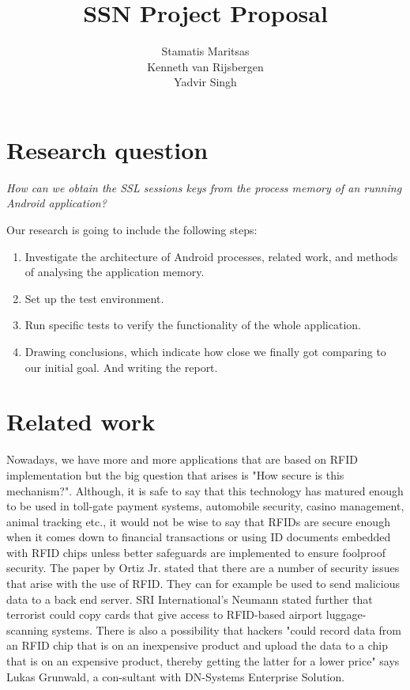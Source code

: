 \documentclass[11pt]{article}
\title{\textbf{SSN Project Proposal}}
\author{Stamatis Maritsas\\
		Kenneth van Rijsbergen\\
		Yadvir Singh}
\date{}
\begin{document}
\maketitle




\section{Research question}

\begin{framed}
\noindent \textit{How can we obtain the SSL sessions keys from the process memory of an running Android application?}
\end{framed}
Our research is going to include the following steps:

\begin{enumerate}
\item{Investigate the architecture of Android processes, related work, and methods of analysing the application memory.}
\item{Set up the test environment.}
\item{Run specific tests to verify the functionality of the whole application.}
\item{Drawing conclusions, which indicate how close we finally got comparing to our initial goal. And writing the report.}
\end{enumerate}

\clearpage

\section{Related work}
Nowadays, we have more and more applications that are based on RFID implementation but the big question that arises is "How secure is this mechanism?". Although, it is safe to say that this technology has matured enough to be used in toll-gate payment systems, automobile security, casino management, animal tracking etc., it would not be wise to say that RFIDs are secure enough when it comes down to financial transactions or using ID documents embedded with RFID chips unless better safeguards are implemented to ensure foolproof security. \cite{grover2011survey}
\newline
\newline
The paper by Ortiz Jr. stated that there are a number of security issues that arise with the use of RFID. They can for example be used to send malicious data to a back end server. SRI International’s Neumann stated further that terrorist could copy cards that give access to RFID-based airport luggage-scanning systems. There is also a possibility that hackers "could record data from an RFID chip that is on an inexpensive product and upload the data to a chip that is on an expensive product, thereby getting the latter for a lower price" says Lukas Grunwald, a con-sultant with DN-Systems Enterprise Solution. \cite{ortiz2006secure}
\end{document}
